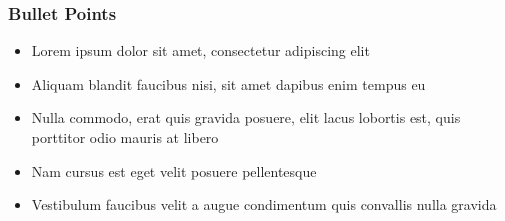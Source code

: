 \begin{frame}
	\frametitle{Bullet Points}
	\begin{itemize}
	\item Lorem ipsum dolor sit amet, consectetur adipiscing elit
	\item Aliquam blandit faucibus nisi, sit amet dapibus enim tempus eu
	\item Nulla commodo, erat quis gravida posuere, elit lacus lobortis est, quis porttitor odio mauris at libero
	\item Nam cursus est eget velit posuere pellentesque
	\item Vestibulum faucibus velit a augue condimentum quis convallis nulla gravida
	\end{itemize}
\end{frame}
% 
% 

